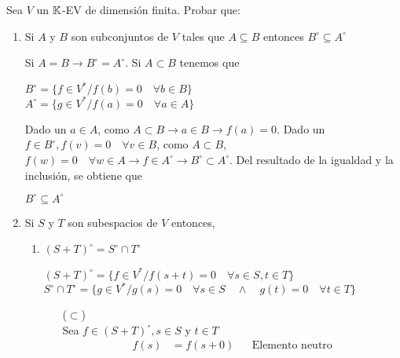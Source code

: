 \item Sea $V$ un $\mathbb{K}$-EV de dimensión finita. Probar que:
    \begin{enumerate}
        \item Si $A$ y $B$ son subconjuntos de $V$ tales que $A\subseteq B$ entonces $B^\circ \subseteq A^\circ$
            \begin{mdframed}[style=s]
                Si $A=B\to B^\circ =A^\circ$. Si $A\subset B$ tenemos que 
                \begin{tightcenter}
                    $B^\circ=\{f\in V^*/f(b)=0\quad\forall b\in B\}$\\
                    $A^\circ=\{g\in V^*/f(a)=0\quad\forall a\in A\}$    
                \end{tightcenter}
                Dado un $a\in A$, como $A\subset B\to a\in B\to f(a)=0$. Dado un $f\in B^\circ, f(v)=0\quad\forall v\in B$, como $A\subset B$, $f(w)=0\quad\forall w\in A\to f\in A^\circ\to B^\circ \subset A^\circ$. Del resultado de la igualdad y la inclusión, se obtiene que
                \begin{tightcenter}
                    $B^\circ \subseteq A^\circ$
                \end{tightcenter}
            \end{mdframed}
        \item Si $S$ y $T$ son subespacios de $V$ entonces,
            \begin{enumerate}
                \item $(S+T)^\circ =S^\circ\cap T^\circ$
                    \begin{mdframed}[style=s]
                        \begin{tightcenter}
                            $(S+T)^\circ=\{f\in V^*/f(s+t)=0\quad\forall s\in S, t\in T\}$\\
                            $S^\circ\cap T^\circ=\{g\in V^*/g(s)=0\quad\forall s\in S\quad\land\quad g(t)=0\quad\forall t\in T\}$
                        \end{tightcenter}
                        \begin{itemize}
                            \item[($\subset$)]\hfill\\
                                Sea $f\in(S+T)^\circ,s\in S$ y $t\in T$
                                \begin{align*}
                                    f(s)&=f(s+0)&&\text{Elemento neutro}\\

\end{align*}
\end{itemize}
\end{mdframed}
\end{enumerate}
\end{enumerate}
